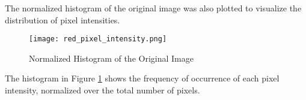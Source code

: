 \begin{tcolorbox}
\begin{sol}
        The normalized histogram of the original image was also plotted to visualize the distribution of pixel intensities.
        
        \begin{figure}[H]
            \centering
            \texttt{[image: red\_pixel\_intensity.png]}
            \caption{Normalized Histogram of the Original Image}
            \label{fig:hist_plot}
        \end{figure}
        
        The histogram in Figure \ref{fig:hist_plot} shows the frequency of occurrence of each pixel intensity, normalized over the total number of pixels.
              
        

        
    \end{sol}
\end{tcolorbox}